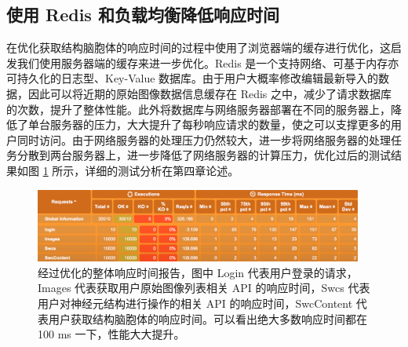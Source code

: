 \subsection{使用 Redis 和负载均衡降低响应时间}
在优化获取结构脑胞体的响应时间的过程中使用了浏览器端的缓存进行优化，这启发我们使用服务器端的缓存来进一步优化。Redis 是一个支持网络、可基于内存亦可持久化的日志型、Key-Value 数据库。由于用户大概率修改编辑最新导入的数据，因此可以将近期的原始图像数据信息缓存在 Redis 之中，减少了请求数据库的次数，提升了整体性能。此外将数据库与网络服务器部署在不同的服务器上，降低了单台服务器的压力，大大提升了每秒响应请求的数量，使之可以支撑更多的用户同时访问。由于网络服务器的处理压力仍然较大，进一步将网络服务器的处理任务分散到两台服务器上，进一步降低了网络服务器的计算压力，优化过后的测试结果如图 \ref{opt} 所示，详细的测试分析在第四章论述。

\begin{figure}
\centering
\includegraphics[width=108mm]{images/opt}
\caption{经过优化的整体响应时间报告，图中 Login 代表用户登录的请求， Images 代表获取用户原始图像列表相关 API 的响应时间，Swcs 代表用户对神经元结构进行操作的相关 API 的响应时间，SwcContent 代表用户获取结构脑胞体的响应时间。可以看出绝大多数响应时间都在 100 ms 一下，性能大大提升。}
\label{opt}
\end{figure}